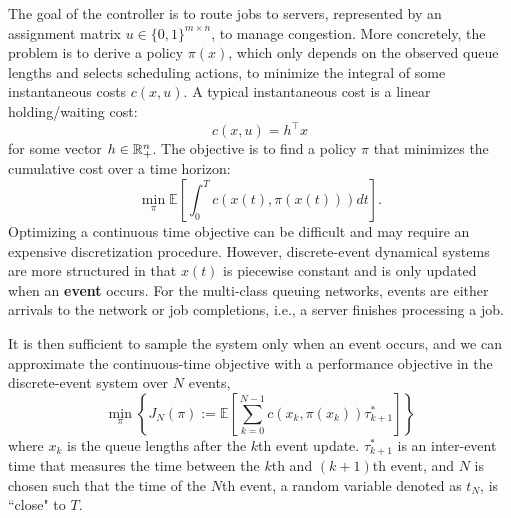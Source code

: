 The goal of the controller is to route jobs to servers, represented by an assignment matrix $u \in \{0, 1 \}^{m \times n}$, to manage congestion. More concretely, the problem is to derive a policy $\pi(x)$, which only depends on the observed queue lengths and selects scheduling actions, to minimize the integral of some instantaneous costs $c(x,u)$. A typical instantaneous cost is a linear holding/waiting cost:
\[
c(x,u)=h^{\top}x
\]
% 
for some vector $h\in\mathbb{R}_{+}^{n}$. The objective is to find a
policy $\pi$ that minimizes the cumulative cost over a time horizon:
\begin{equation}
\min_{\pi}\mathbb{E}\left[\int_{0}^{T}c(x(t),\pi(x(t)))dt\right].\label{eq:time-average-cost}
\end{equation}
Optimizing a continuous time objective can be difficult and may require an expensive discretization procedure. However, discrete-event dynamical systems are more structured in that $x(t)$ is piecewise constant and is only updated when an {\bf event} occurs. For the multi-class queuing networks, events are either arrivals to the network or job completions, i.e., a server finishes processing a job.

It is then sufficient to sample the system only when an event occurs, and we can approximate the continuous-time objective with a performance objective in the discrete-event system over $N$ events,
\begin{equation}
\min_{\pi}
\left\{J_{N}(\pi) := \mathbb{E}\left[\sum_{k=0}^{N-1}c(x_{k},\pi(x_{k}))\tau_{k+1}^*\right]
\right\}
\label{eq:des-cost}
\end{equation}
where $x_k$ is the queue lengths after the $k$th event update. $\tau^{*}_{k+1}$ is an inter-event time that measures the time between the $k$th and $(k+1)$th event, and $N$ is chosen such that the time of the $N$th event, a random variable denoted as $t_{N}$, is ``close" to $T$.


